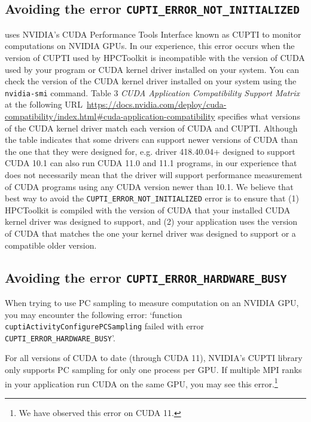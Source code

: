 \documentclass[11pt,twoside,letterpaper]{report}
\begin{document}
\subsection{Avoiding the error \texttt{CUPTI\_ERROR\_NOT\_INITIALIZED}}
\label{sec:troubleshooting:cupti}

\hpcrun{} uses NVIDIA's CUDA Performance Tools Interface known as
CUPTI to monitor computations on NVIDIA GPUs. In our experience,
this error occurs when the version of CUPTI used by HPCToolkit is
incompatible with the version of CUDA used by your program or CUDA kernel driver installed on your system. You can check the
version of the CUDA kernel driver installed on your system using the {\tt nvidia-smi} command.
Table 3 {\em CUDA Application Compatibility Support Matrix} at the following URL~\url{https://docs.nvidia.com/deploy/cuda-compatibility/index.html\#cuda-application-compatibility}
specifies what versions of the CUDA kernel driver match each version of CUDA and CUPTI.
Although the table indicates that some drivers can support newer versions of CUDA than the one that they were designed for,
e.g. driver 418.40.04+ designed to support CUDA 10.1 can also run CUDA 11.0 and 11.1 programs,
in our experience that does not necessarily mean that the driver will support performance measurement of CUDA programs
using any CUDA version newer than 10.1.
We believe that best way to avoid the \texttt{CUPTI\_ERROR\_NOT\_INITIALIZED} error is to ensure that
(1) HPCToolkit is compiled with the version of CUDA that your installed CUDA kernel driver was designed to support, and
(2) your application uses the version of CUDA that matches the one your kernel driver was designed to support or a compatible older version.



\subsection{Avoiding the error {\tt CUPTI\_ERROR\_HARDWARE\_BUSY}}

When trying to use PC sampling to measure computation on an NVIDIA GPU, you may encounter the following error: `function {\tt cuptiActivityConfigurePCSampling} failed with error {\tt CUPTI\_ERROR\_HARDWARE\_BUSY}'.

For all versions of CUDA  to date (through CUDA 11), NVIDIA's CUPTI library only supports PC sampling for only one process per GPU. If multiple MPI ranks in your application run CUDA on the same GPU, you may see this error.\footnote{We have observed this error on CUDA 11.}
\end{document}
